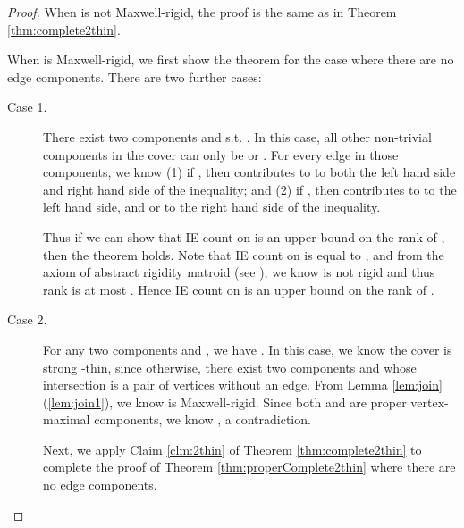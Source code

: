 \documentclass[10pt]{article}
\begin{document}
\begin{proof}
When  is not Maxwell-rigid, the proof is the same as in Theorem \ref{thm:complete2thin}.

When  is Maxwell-rigid, we first show the theorem for the case where there are no edge components. There are two further cases:
\begin{description}

\item[Case 1.] There exist two components  and  s.t.     . In this case, all other non-trivial components in the cover can only be  or . For every edge  in those components, we know (1) if  , then  contributes to  to both the left hand side and right hand side of the inequality; and (2) if  ,  then  contributes to  to the left hand side, and  or  to the right hand side of the inequality. 

Thus if we can show that IE count on  is an upper bound on the rank of , then the theorem holds. Note that IE count on  is equal to , and from the axiom  of abstract rigidity matroid (see \cite{graver:servatius:rigidityBook:1993}), we know  is not rigid and thus rank is at most . Hence IE count on  is an upper bound on the rank of .


\item[Case 2.] For any two components  and , we have     . In this case, we know the cover is strong -thin, since otherwise, there exist two components  and  whose intersection is a pair of vertices without an edge. From Lemma \ref{lem:join}(\ref{lem:join1}), we know  is Maxwell-rigid. Since both  and  are proper vertex-maximal components, we know     , a contradiction.

Next, we apply Claim \ref{clm:2thin} of Theorem \ref{thm:complete2thin} to complete the proof of Theorem \ref{thm:properComplete2thin} where there are no edge components.

\begin{comment}
Next, we can 

follow the proof of Theorem \ref{thm:complete2thin}. First we can obtain that for every edge , there is at most one  where  contains  s.t.  is Maxwell-dependent. Otherwise, if there is an edge  s.t. (1) there are two components  and  containing  and (2)  and  are both Maxwell-dependent, then from Lemma \ref{obs:maximal}(\ref{obs:maximal2}), we can see that   , a contradiction.

Then we can divide edges of  into , , , and . Following the proof of Theorem \ref{thm:complete2thin}, we can construct a subgraph  with   IE. Using proper maximality and completeness of the cover, we can show that  is Maxwell-independent.


\end{comment}
\end{description}
\end{proof}
\end{document}
